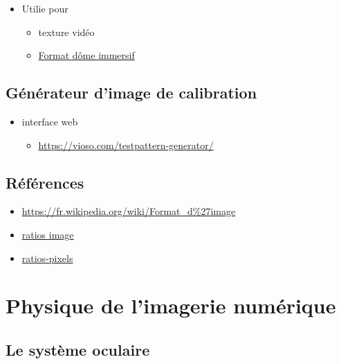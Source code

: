 \documentclass[
  french,
]{book}
\providecommand{\tightlist}{%
  \setlength{\itemsep}{0pt}\setlength{\parskip}{0pt}}
\begin{document}
\begin{itemize}
\tightlist
\item
  Utilie pour

  \begin{itemize}
  \tightlist
  \item
    texture vidéo
  \item
    \href{https://vioso.com/softedge-patterngenerator/domegrids/CubeMap_4096x4096.png}{Format dôme immersif}
  \end{itemize}
\end{itemize}

\hypertarget{guxe9nuxe9rateur-dimage-de-calibration}{%
\subsection{Générateur d'image de calibration}\label{guxe9nuxe9rateur-dimage-de-calibration}}

\begin{itemize}
\tightlist
\item
  interface web

  \begin{itemize}
  \tightlist
  \item
    \url{https://vioso.com/testpattern-generator/}
  \end{itemize}
\end{itemize}

\hypertarget{ruxe9fuxe9rences}{%
\subsection{Références}\label{ruxe9fuxe9rences}}

\begin{itemize}
\tightlist
\item
  \url{https://fr.wikipedia.org/wiki/Format_d\%27image}
\item
  \href{https://en.wikipedia.org/wiki/Display_aspect_ratio}{ratios image}
\item
  \href{https://en.wikipedia.org/wiki/Pixel_aspect_ratio}{ratios-pixels}
\end{itemize}

\hypertarget{physique-de-limagerie-numuxe9rique}{%
\section{Physique de l'imagerie numérique}\label{physique-de-limagerie-numuxe9rique}}

\hypertarget{le-systuxe8me-oculaire}{%
\subsection{Le système oculaire}\label{le-systuxe8me-oculaire}}
\end{document}
